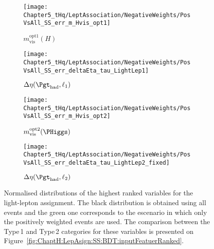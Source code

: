 \begin{figure}[h]
    \centering
    \begin{subfigure}[b]{0.44\textwidth}
        \centering
        \texttt{[image: Chapter5\_tHq/LeptAssociation/NegativeWeights/PosVsAll\_SS\_err\_m\_Hvis\_opt1]}
        \caption{$m^{\text{opt1}}_{\text{vis}}(H)$}
        \label{fig:Appendix:BDTVARS:LeptonAssignment:m_Hvis_opt1}
    \end{subfigure}
    \hfill 
    \begin{subfigure}[b]{0.44\textwidth}
        \centering
        \texttt{[image: Chapter5\_tHq/LeptAssociation/NegativeWeights/PosVsAll\_SS\_err\_deltaEta\_tau\_LightLep1]}
        \caption{$\Delta \eta(\tauhad, \ell_{1})$}
        \label{fig:Appendix:BDTVARS:LeptonAssignmen:dEta1}
    \end{subfigure}
    
    \begin{subfigure}[b]{0.44\textwidth}
        \centering
        \texttt{[image: Chapter5\_tHq/LeptAssociation/NegativeWeights/PosVsAll\_SS\_err\_m\_Hvis\_opt2]}
        \caption{$m^{\text{opt2}}_{\text{vis}}(\PHiggs)$}
        \label{fig:Appendix:BDTVARS:LeptonAssignmen:m_H2}
    \end{subfigure}
    \hfill
    \begin{subfigure}[b]{0.44\textwidth}
        \centering
        \texttt{[image: Chapter5\_tHq/LeptAssociation/NegativeWeights/PosVsAll\_SS\_err\_deltaEta\_tau\_LightLep2\_fixed]}
        \caption{$\Delta \eta(\tauhad, \ell_{2})$}
        \label{fig:Appendix:BDTVARS:LeptonAssignmen:dEta2}
    \end{subfigure}
    \caption{Normalised distributions of the highest ranked variables for the light-lepton assignment. 
    The black distribution is obtained using all events and the green one corresponds to the escenario in
    which only the positively weighted events are used. The comparison between the Type$\,$1 and Type$\,$2
    categories for these variables is presented on
    Figure~\ref{fig:ChaptH:LepAsign:SS:BDT:inputFeatuerRanked}.}
    \label{fig:Appendix:BDTVARS:LeptonAssignmen:Top$}
\end{figure}




